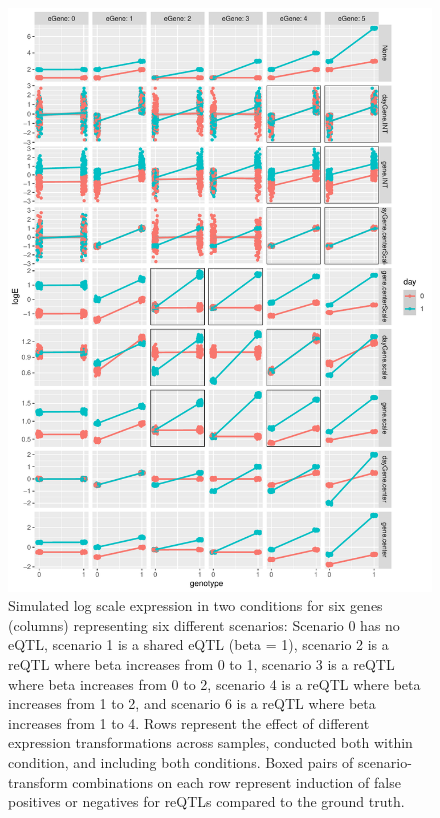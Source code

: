 \begin{figure}
    \centering
    \includegraphics[width=1.0\textwidth,page=1]{mainmatter/figures/chapter_03/simulate_expression_transforms.pdf}
    \caption{
        Simulated log scale expression in two conditions for six genes (columns) representing six different scenarios:
            Scenario 0 has no \gls{eQTL}, 
            scenario 1 is a shared eQTL (beta = 1), 
            scenario 2 is a \gls{reQTL} where beta increases from 0 to 1,
            scenario 3 is a \gls{reQTL} where beta increases from 0 to 2,
            scenario 4 is a \gls{reQTL} where beta increases from 1 to 2,
            and scenario 6 is a \gls{reQTL} where beta increases from 1 to 4.
            Rows represent the effect of different expression transformations across samples, conducted both within condition, and including both conditions.
            Boxed pairs of scenario-transform combinations on each row represent induction of false positives or negatives for reQTLs compared to the ground truth.
    }
    \label{fig:hird_eQTL_expressionTransform_sims}
\end{figure}

